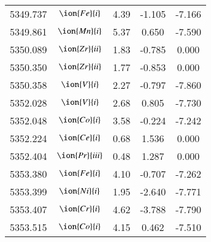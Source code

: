 \documentclass[fleqn,usenatbib]{mnras}
\begin{document}
\begin{center}
\begin{table}
\begin{tabular}{ccccc}
5349.737 &  $\ion{Fe}{i}$  & 4.39 & -1.105 & -7.166 \\ 
5349.861 &  $\ion{Mn}{i}$  & 5.37 & 0.650 & -7.590 \\ 
5350.089 &  $\ion{Zr}{ii}$  & 1.83 & -0.785 & 0.000 \\ 
5350.350 &  $\ion{Zr}{ii}$  & 1.77 & -0.853 & 0.000 \\ 
5350.358 &  $\ion{V}{i}$  & 2.27 & -0.797 & -7.860 \\ 
5352.028 &  $\ion{V}{i}$  & 2.68 & 0.805 & -7.730 \\ 
5352.048 &  $\ion{Co}{i}$  & 3.58 & -0.224 & -7.242 \\ 
5352.224 &  $\ion{Ce}{i}$  & 0.68 & 1.536 & 0.000 \\ 
5352.404 &  $\ion{Pr}{iii}$  & 0.48 & 1.287 & 0.000 \\ 
5353.380 &  $\ion{Fe}{i}$  & 4.10 & -0.707 & -7.262 \\ 
5353.399 &  $\ion{Ni}{i}$  & 1.95 & -2.640 & -7.771 \\ 
5353.407 &  $\ion{Cr}{i}$  & 4.62 & -3.788 & -7.790 \\ 
5353.515 &  $\ion{Co}{i}$  & 4.15 & 0.462 & -7.510 \\ 
 \end{tabular}
 \end{table}
 \end{center}
 
\end{document}
